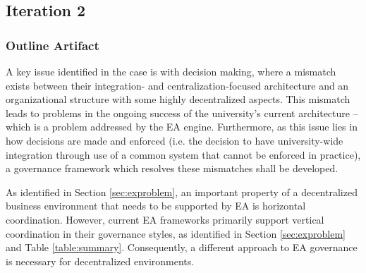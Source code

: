 %
%
%
%
%
%
%
%
%

\subsection{Iteration 2}

\subsubsection*{Outline Artifact}

A key issue identified in the case is with decision making, where a mismatch exists between their integration- and centralization-focused architecture and an organizational structure with some highly decentralized aspects. This mismatch leads to problems in the ongoing success of the university's current architecture -- which is a problem addressed by the EA engine. Furthermore, as this issue lies in how decisions are made and enforced (i.e. the decision to have university-wide integration through use of a common system that cannot be enforced in practice), a governance framework which resolves these mismatches shall be developed. 

As identified in Section \ref{sec:exproblem}, an important property of a decentralized business environment that needs to be supported by EA is horizontal coordination. However, current EA frameworks primarily support vertical coordination in their governance styles, as identified in Section \ref{sec:exproblem} and Table \ref{table:summary}. Consequently, a different approach to EA governance is necessary for decentralized environments.

